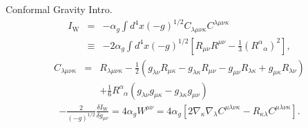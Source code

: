 \documentclass[8pt]{beamer}
\begin{document}
\begin{frame}{Conformal Gravity Intro.}
	\begin{eqnarray*}
		I_\text{W} &=& -\alpha_g \int d^4x (-g)^{1/2}C_{\lambda\mu\nu\kappa}C^{\lambda\mu\nu\kappa}
		\nonumber\\
		&\equiv& -2\alpha_g \int d^4x(-g)^{1/2}\left[R_{\mu\nu}R^{\mu\nu} - \tfrac{1}{3}(R^\alpha{}_\alpha)^2\right],
		\label{IW}
	\end{eqnarray*}
	\begin{eqnarray*}
		C_{\lambda\mu\nu\kappa}&=& R_{\lambda\mu\nu\kappa}
		-\frac{1}{2}\left(g_{\lambda\nu}R_{\mu\kappa}-
		g_{\lambda\kappa}R_{\mu\nu}-
		g_{\mu\nu}R_{\lambda\kappa}+
		g_{\mu\kappa}R_{\lambda\nu}\right)
		\\
		&&+\frac{1}{6}R^{\alpha}_{\phantom{\alpha}\alpha}\left(
		g_{\lambda\nu}g_{\mu\kappa}-
		g_{\lambda\kappa}g_{\mu\nu}\right)
	\end{eqnarray*}
	\begin{eqnarray*}
		-\frac{2}{(-g)^{1/2}} \frac{\delta I_{\text{W}}}{\delta g_{\mu\nu}}= 4\alpha_gW^{\mu\nu} = 4\alpha_g \left[2\nabla_\kappa\nabla_\lambda C^{\mu\lambda\nu\kappa} - R_{\kappa\lambda}C^{\mu\lambda\nu\kappa}\right].
		\label{Bachtensor}
	\end{eqnarray*}
\end{frame}

\begin{frame}{}

\end{frame}

\begin{frame}{}
	
\end{frame}

\begin{frame}{}
	
\end{frame}
\end{document}
